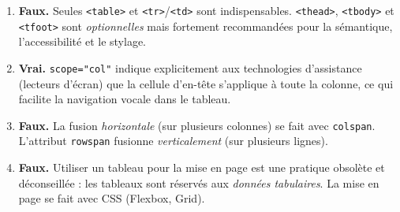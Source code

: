 \documentclass[11pt]{article}
\begin{document}
\begin{corrige}
\begin{enumerate}
    \item \textbf{Faux.} Seules \texttt{<table>} et \texttt{<tr>}/\texttt{<td>} sont indispensables. \texttt{<thead>}, \texttt{<tbody>} et \texttt{<tfoot>} sont \emph{optionnelles} mais fortement recommandées pour la sémantique, l'accessibilité et le stylage.
    \item \textbf{Vrai.} \texttt{scope="col"} indique explicitement aux technologies d'assistance (lecteurs d'écran) que la cellule d'en-tête s'applique à toute la colonne, ce qui facilite la navigation vocale dans le tableau.
    \item \textbf{Faux.} La fusion \emph{horizontale} (sur plusieurs colonnes) se fait avec \texttt{colspan}. L'attribut \texttt{rowspan} fusionne \emph{verticalement} (sur plusieurs lignes).
    \item \textbf{Faux.} Utiliser un tableau pour la mise en page est une pratique obsolète et déconseillée : les tableaux sont réservés aux \emph{données tabulaires}. La mise en page se fait avec CSS (Flexbox, Grid).
\end{enumerate}
\end{corrige}
\end{document}
